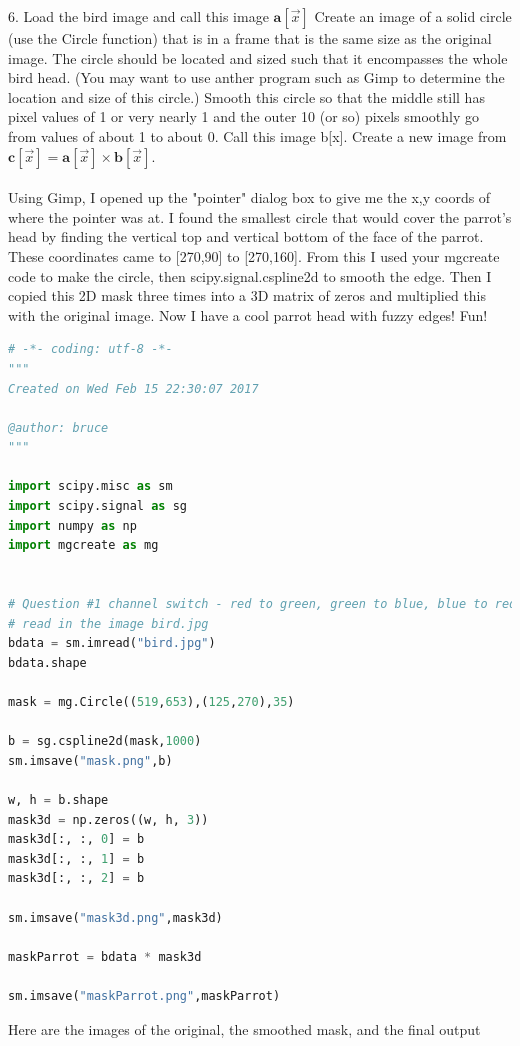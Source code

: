 \documentclass[12pt]{article}
\begin{document}
6.	Load the bird image and call this image $ \boldsymbol{a}[\vec{x}]$ Create an image of a solid circle (use the Circle function) that is in a frame that is the same size as the original image. The circle should be located and sized such that it encompasses the whole bird head. (You may want to use anther program such as Gimp to determine the location and size of this circle.)  Smooth this circle so that the middle still has pixel values of 1 or very nearly 1 and the outer 10 (or so) pixels smoothly go from values of about 1 to about 0. Call this image b[x]. Create a new image from $ \boldsymbol{c}[\vec{x}]= \boldsymbol{a}[\vec{x}] \times \boldsymbol{b}[\vec{x}]$.\\\\
Using Gimp, I opened up the "pointer" dialog box to give me the x,y coords of where the pointer was at.  I found the smallest circle that would cover the parrot's head by finding the vertical top and vertical bottom of the face of the parrot.  These coordinates came to [270,90] to [270,160].  From this I used your mgcreate code to make the circle, then scipy.signal.cspline2d to smooth the edge.  Then I copied this 2D mask three times into a 3D matrix of zeros and multiplied this with the original image.  Now I have a cool parrot head with fuzzy edges! Fun!\\
\begin{lstlisting}[language=Python]
# -*- coding: utf-8 -*-
"""
Created on Wed Feb 15 22:30:07 2017

@author: bruce
"""

import scipy.misc as sm
import scipy.signal as sg
import numpy as np
import mgcreate as mg


# Question #1 channel switch - red to green, green to blue, blue to red
# read in the image bird.jpg
bdata = sm.imread("bird.jpg")
bdata.shape

mask = mg.Circle((519,653),(125,270),35)

b = sg.cspline2d(mask,1000)
sm.imsave("mask.png",b)

w, h = b.shape
mask3d = np.zeros((w, h, 3))
mask3d[:, :, 0] = b
mask3d[:, :, 1] = b
mask3d[:, :, 2] = b

sm.imsave("mask3d.png",mask3d)
     
maskParrot = bdata * mask3d
      
sm.imsave("maskParrot.png",maskParrot)
\end{lstlisting}
Here are the images of the original, the smoothed mask, and the final output
\end{document}
